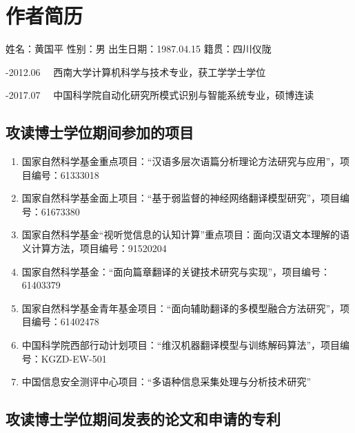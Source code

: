 
\chapter{作者简历}

\noindent 姓名：黄国平 \qquad 性别：男 \qquad 出生日期：1987.04.15    \qquad 籍贯：四川仪陇

-2012.06 \ \ 西南大学计算机科学与技术专业，获工学学士学位

-2017.07 \ \ 中国科学院自动化研究所模式识别与智能系统专业，硕博连读

\vskip 2cm

\begin{center}
	\section*{攻读博士学位期间参加的项目}
\end{center}

\begin{enumerate}[(1)]
	\item 国家自然科学基金重点项目：“汉语多层次语篇分析理论方法研究与应用”，项目编号：61333018
	
	\item 国家自然科学基金面上项目：“基于弱监督的神经网络翻译模型研究”，项目编号：61673380
	
	\item 国家自然科学基金“视听觉信息的认知计算”重点项目：面向汉语文本理解的语义计算方法，项目编号：91520204
	
	\item 国家自然科学基金：“面向篇章翻译的关键技术研究与实现”，项目编号：61403379
	
	\item 国家自然科学基金青年基金项目：“面向辅助翻译的多模型融合方法研究”，项目编号：61402478
	
	\item 中国科学院西部行动计划项目：“维汉机器翻译模型与训练解码算法”，项目编号：KGZD-EW-501
	
	\item 中国信息安全测评中心项目：“多语种信息采集处理与分析技术研究”
\end{enumerate}

\pagebreak[4]

\begin{center}
	\section*{攻读博士学位期间发表的论文和申请的专利}
\end{center}

